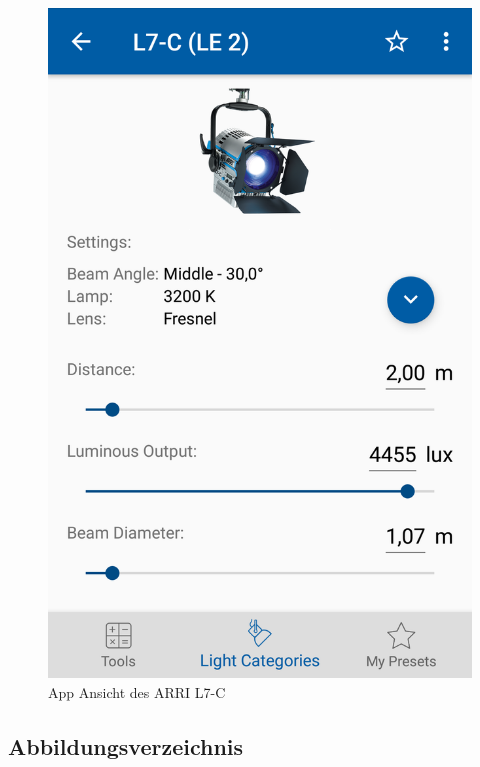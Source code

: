 \documentclass[11pt]{scrartcl}
\begin{document}
\begin{figure}[H]
    \begin{center}
        \includegraphics[width=.7\textwidth]{images/arri_l7_data.png}
    \end{center}
    \caption{App Ansicht des ARRI L7-C}
\end{figure}
\noindent
\clearpage

\subsection{Abbildungsverzeichnis}
\begingroup
\renewcommand{\section}[2]{}
\listoffigures
\endgroup
\clearpage
\end{document}
